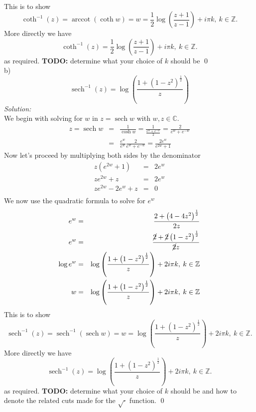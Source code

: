 \documentclass[10pt]{amsart}
\DeclareMathOperator{\sech}{sech}
\theoremstyle{nonumberplain}
\begin{document}
\begin{enumerate}[label={\bf {\arabic*}:}]
\begin{eqnarray*}
\end{eqnarray*}
This is to show
$$\coth^{-1}(z) = \operatorname{arccot}(\coth w) = w = \frac{1}{2}\log \left(\frac{z + 1}{z - 1} \right) + i\pi k, \: k \in \mathbb{Z}.$$
More directly we have 
$$\coth^{-1}(z) = \frac{1}{2}\log \left(\frac{z + 1}{z - 1} \right) + i\pi k, \: k \in \mathbb{Z}.$$
as required. 
\textbf{TODO:} determine what your choice of $k$ should be \qed \\
b) $$\sech^{-1}(z) = \log \left(\frac{1 + (1 - z^2)^{\frac{1}{2}}}{z}\right)$$
\textit{Solution:} \\
We begin with solving for $w$ in $z = \sech{w}$ with $w, z \in \mathbb{C}$. 
\begin{eqnarray*}
z = \sech{w} &=& \frac{1}{\cosh w} = \frac{1}{\frac{e^{w} + e^{-w}}{2}} = \frac{2}{e^{w} + e^{-w}} \\
	  &=& \frac{e^{w}}{e^{w}} \frac{2}{e^{w} + e^{-w}} = \frac{ 2e^{w}}{ e^{2w} + 1 }
\end{eqnarray*}
Now let's proceed by multiplying both sides by the denominator
\begin{eqnarray*}
z\left( e^{2w} + 1 \right) &=&  2e^{w}\\
ze^{2w} + z &=&  2e^{w}\\
ze^{2w} - 2e^{w}+ z &=&  0\\
\end{eqnarray*}
We now use the quadratic formula to solve for $e^{w}$
\begin{eqnarray*}
e^{w} &=& \frac{2 + \left(4 - 4z^2\right)^{\frac{1}{2}}}{2z} \\
e^{w} &=& \frac{\cancel2 + \cancel2\left(1 - z^2\right)^{\frac{1}{2}}}{\cancel2z} \\
\log e^{w} &=& \log\left(\frac{1 + \left(1 - z^2\right)^{\frac{1}{2}}}{z} \right) + 2i\pi k, \: k \in \mathbb{Z} \\
w &=& \log\left(\frac{1 + \left(1 - z^2\right)^{\frac{1}{2}}}{z} \right) + 2i\pi k, \: k \in \mathbb{Z} \\
\end{eqnarray*}
This is to show
$$\sech^{-1}(z) = \sech^{-1}(\sech w) = w = \log\left(\frac{1 + \left(1 - z^2\right)^{\frac{1}{2}}}{z} \right) + 2i\pi k, \: k \in \mathbb{Z}.$$
More directly we have 
$$\sech^{-1}(z) = \log\left(\frac{1 + \left(1 - z^2\right)^{\frac{1}{2}}}{z} \right) + 2i\pi k, \: k \in \mathbb{Z}.$$
as required. 
\textbf{TODO:} determine what your choice of $k$ should be and how to denote the related cuts made for the $\sqrt{\cdot}$ function.
\qed \\

\end{enumerate}
\end{document}
